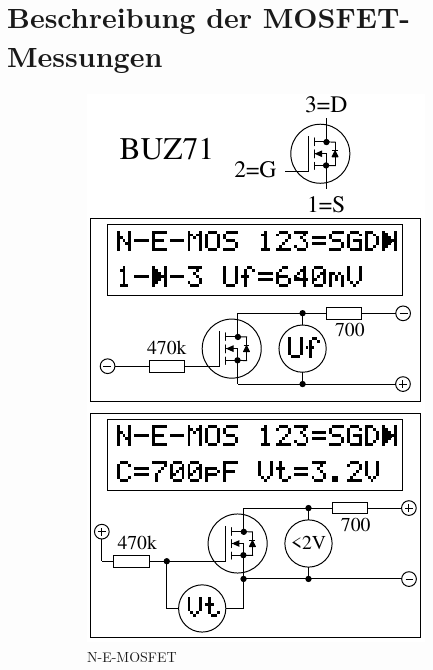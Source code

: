 \chapter{Beschreibung der MOSFET-Messungen}
\label{sec:MOSmeasurements}

\begin{figure}[H]
  \begin{subfigure}[b]{.5\textwidth}
    \centering
    \includegraphics[width=1.\textwidth]{../FIG/MOS_BUZ71.pdf}
    \caption{N-E-MOSFET}
    \label{fig:MOS-N-E}
  \end{subfigure}
  ~
  \begin{subfigure}[b]{.5\textwidth}

\end{subfigure}
\end{figure}
